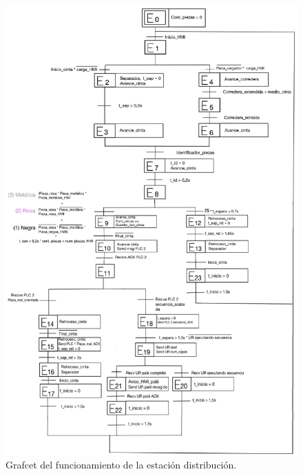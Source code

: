 \begin{figure} [h!]
  \begin{center}
    \includegraphics[width=15.5cm]{figs/grafcet_distribucion}
  \end{center}
  \caption{\centering Grafcet del funcionamiento de la estación distribución.}
  \label{fig:grafcet_distribucion}
\end{figure} 

\clearpage

